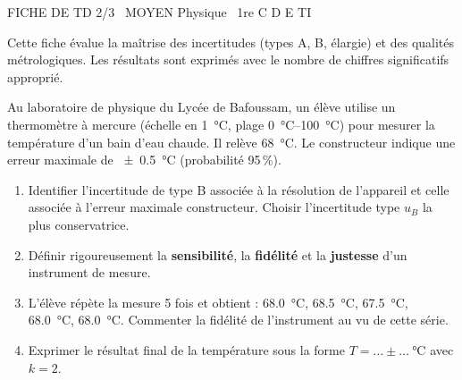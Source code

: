 \documentclass[11pt]{article}
\begin{document}
\begin{tcolorbox}[enhanced,colback=popink,colframe=popink,arc=10pt,boxrule=0pt,left=12pt,right=12pt,top=9pt,bottom=9pt]
{\color{white}\popxbold\small FICHE DE TD 2/3 \textbullet\ MOYEN \hfill Physique \textbullet\ 1re C D E TI\par}
\end{tcolorbox}
\vspace{4pt}
Cette fiche évalue la maîtrise des incertitudes (types A, B, élargie) et des qualités métrologiques. Les résultats sont exprimés avec le nombre de chiffres significatifs approprié.

\begin{exercice}
Au laboratoire de physique du Lycée de Bafoussam, un élève utilise un thermomètre à mercure (échelle en \SI{1}{\celsius}, plage \SIrange{0}{100}{\celsius}) pour mesurer la température d'un bain d'eau chaude. Il relève \SI{68}{\celsius}. Le constructeur indique une erreur maximale de \SI{\pm 0.5}{\celsius} (probabilité 95\,\%).
\begin{enumerate}
    \item Identifier l'incertitude de type B associée à la résolution de l'appareil et celle associée à l'erreur maximale constructeur. Choisir l'incertitude type $u_B$ la plus conservatrice.
    \item Définir rigoureusement la \textbf{sensibilité}, la \textbf{fidélité} et la \textbf{justesse} d'un instrument de mesure.
    \item L'élève répète la mesure 5 fois et obtient : \SI{68.0}{\celsius}, \SI{68.5}{\celsius}, \SI{67.5}{\celsius}, \SI{68.0}{\celsius}, \SI{68.0}{\celsius}. Commenter la fidélité de l'instrument au vu de cette série.
    \item Exprimer le résultat final de la température sous la forme $T = \ldots \pm \ldots\ \si{\celsius}$ avec $k=2$.
\end{enumerate}
\end{exercice}
\end{document}
